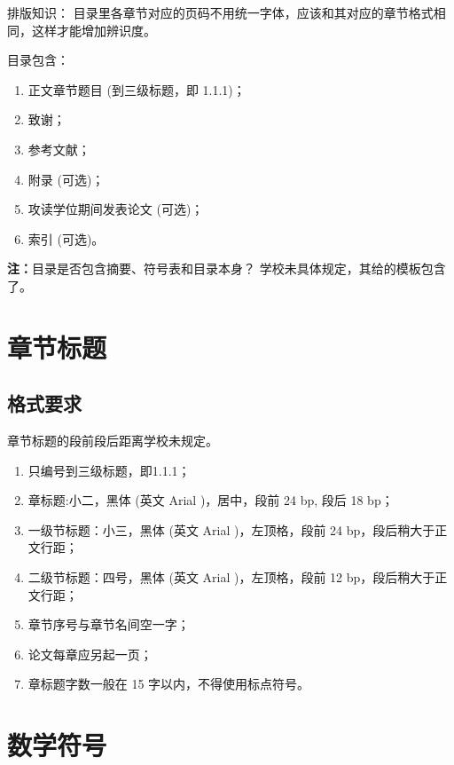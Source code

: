 \documentclass{swputhesis}
\begin{document}
\textsf{排版知识：} 目录里各章节对应的页码不用统一字体，应该和其对应的章节格式相同，这样才能增加辨识度。

目录包含：

\begin{enumerate}
	\item 正文章节题目 (到三级标题，即 1.1.1)；
	\item 致谢；
	\item 参考文献；
	\item 附录 (可选)；
	\item 攻读学位期间发表论文 (可选)；
	\item 索引 (可选)。
\end{enumerate}

\textbf{注：}目录是否包含摘要、符号表和目录本身？ 学校未具体规定，其给的模板包含了。

\section{章节标题}

\subsection{格式要求}

章节标题的段前段后距离学校未规定。

\begin{enumerate}
	\item 只编号到三级标题，即1.1.1；
	\item	章标题:小二，黑体 (英文 Arial )，居中，段前 24 bp, 段后 18 bp；
	\item 一级节标题：小三，黑体 (英文 Arial )，左顶格，段前 24 bp，段后稍大于正文行距；
	\item 二级节标题：四号，黑体 (英文 Arial )，左顶格，段前 12 bp，段后稍大于正文行距；
	\item 章节序号与章节名间空一字；
	\item 论文每章应另起一页；
	\item 章标题字数一般在 15 字以内，不得使用标点符号。
\end{enumerate}

\section{数学符号}
\end{document}
